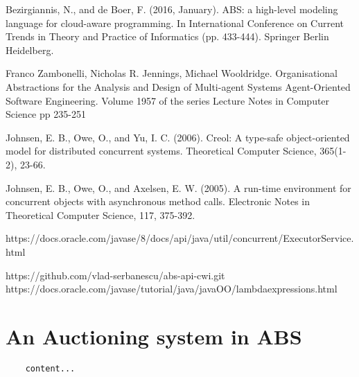 \documentclass[runningheads,a4paper]{llncs}
\begin{document}
\begin{thebibliography}{4}
		 Bezirgiannis, N., and de Boer, F. (2016, January). ABS: a high-level modeling language for cloud-aware programming. In International Conference on Current Trends in Theory and Practice of Informatics (pp. 433-444). Springer Berlin Heidelberg.
		
		Franco Zambonelli, Nicholas R. Jennings, Michael Wooldridge. 
		Organisational Abstractions for the Analysis and Design of Multi-agent Systems
		Agent-Oriented Software Engineering. Volume 1957 of the series Lecture Notes in Computer Science pp 235-251
		
		 Johnsen, E. B., Owe, O., and Yu, I. C. (2006). Creol: A type-safe object-oriented model for distributed concurrent systems. Theoretical Computer Science, 365(1-2), 23-66.
		
		 Johnsen, E. B., Owe, O., and Axelsen, E. W. (2005). A run-time environment for concurrent objects with asynchronous method calls. Electronic Notes in Theoretical Computer Science, 117, 375-392.
		
		 https://docs.oracle.com/javase/8/docs/api/java/util/concurrent/ExecutorService.html
		
		https://github.com/vlad-serbanescu/abs-api-cwi.git
		 https://docs.oracle.com/javase/tutorial/java/javaOO/lambdaexpressions.html
	\end{thebibliography}
	
\appendix 
\section{An Auctioning system in ABS}
\begin{lstlisting}
	content...
\end{lstlisting}
	
\end{document}
